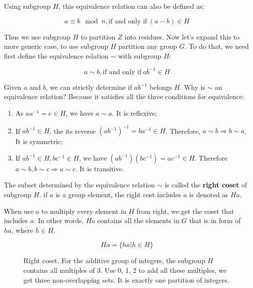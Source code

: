 \documentclass{article}
\begin{document}
Using subgroup $H$, this equivalence relation can also be defined as:

\[
a \equiv b \mod n, \text{if and only if}\ (a - b) \in H
\]

Thus we use subgroup $H$ to partition $Z$ into residues. Now let's expand this to more generic case, to use subgroup $H$ partition any group $G$. To do that, we need first define the equivalence relation $\sim$ with subgroup $H$:

\[
a \sim b, \text{if and only if}\ ab^{-1} \in H
\]

Given $a$ and $b$, we can strictly determine if $ab^{-1}$ belongs $H$. Why is $\sim$ an equivalence relation? Because it satisfies all the three conditions for equivalence:

\begin{enumerate}
\item As $aa^{-1} = e \in H$, we have $a \sim a$. It is reflexive;
\item If $ab^{-1} \in H$, the its reverse $(ab^{-1})^{-1}= ba^{-1} \in H$. Therefore, $a \sim b \Rightarrow b \sim a$. It is symmetric;
\item If $ab^{-1} \in H, bc^{-1} \in H$, we have $(ab^{-1})(bc^{-1}) = ac^{-1} \in H$. Therefore $a \sim b, b \sim c \Rightarrow a \sim c$. It is transitive.
\end{enumerate}

\begin{definition}
The subset determined by the equivalence relation $\sim$ is called the \textbf{right coset} of subgroup $H$. if $a$ is a group element, the right cost includes $a$ is denoted as $Ha$.
\end{definition}

When use $a$ to multiply every element in $H$ from right, we get the coset that includes $a$. In other words, $Ha$ contains all the elements in $G$ that is in form of $ha$, where $h \in H$.

\[
Ha = \{ha | h \in H\}
\]

\begin{figure}[htbp]
\centering
{}
\caption{Right coset. For the additive group of integers, the subgroup $H$ contains all multiples of 3. Use 0, 1, 2 to add all these multiples, we get three non-overlapping sets. It is exactly one partition of integers.}
\label{fig:right-cosets-Z3}
\end{figure}
\end{document}
